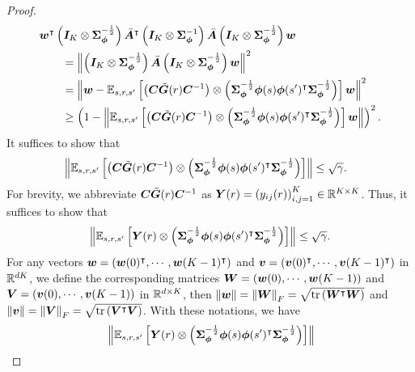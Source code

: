 \begin{proof}
\begin{equation*}
\begin{aligned}
        &{\bm{w}}^{\intercal} \left({{\bm{I}}_K\otimes{\bm{\Sigma}}_{{\bm{\phi}}}^{-\frac{1}{2}}}\right)\bar{{\bm{A}}}^{\intercal}\left({{\bm{I}}_K\otimes{\bm{\Sigma}}_{{\bm{\phi}}}^{-1}}\right)\bar{{\bm{A}}}\left({{\bm{I}}_K\otimes{\bm{\Sigma}}_{{\bm{\phi}}}^{-\frac{1}{2}}}\right){\bm{w}}\\
        &\qquad=\left\|{\left({{\bm{I}}_K\otimes{\bm{\Sigma}}_{{\bm{\phi}}}^{-\frac{1}{2}}}\right)\bar{{\bm{A}}}\left({{\bm{I}}_K\otimes{\bm{\Sigma}}_{{\bm{\phi}}}^{-\frac{1}{2}}}\right){\bm{w}}}\right\|^2\\
        &\qquad=\left\|{{\bm{w}}- {\mathbb E}_{s, r, s^\prime}\left[{\left({{\bm{C}}\tilde{{\bm{G}}}(r){\bm{C}}^{-1}}\right)\otimes\left({{\bm{\Sigma}}_{{\bm{\phi}}}^{-\frac{1}{2}}{\bm{\phi}}(s){\bm{\phi}}(s^\prime)^{\intercal}{\bm{\Sigma}}_{{\bm{\phi}}}^{-\frac{1}{2}}}\right)}\right]{\bm{w}} }\right\|^2\\
        &\qquad\geq\left({1-\left\|{ {\mathbb E}_{s, r, s^\prime}\left[{\left({{\bm{C}}\tilde{{\bm{G}}}(r){\bm{C}}^{-1}}\right)\otimes\left({{\bm{\Sigma}}_{{\bm{\phi}}}^{-\frac{1}{2}}{\bm{\phi}}(s){\bm{\phi}}(s^\prime)^{\intercal}{\bm{\Sigma}}_{{\bm{\phi}}}^{-\frac{1}{2}}}\right)}\right]{\bm{w}}  }\right\| }\right)^2.
\end{aligned}
\end{equation*}
It suffices to show that
    \begin{equation}\label{eq:biscuit_matrix_bound}
\begin{aligned}
        &\left\|{ {\mathbb E}_{s, r, s^\prime}\left[{\left({{\bm{C}}\tilde{{\bm{G}}}(r){\bm{C}}^{-1}}\right)\otimes\left({{\bm{\Sigma}}_{{\bm{\phi}}}^{-\frac{1}{2}}{\bm{\phi}}(s){\bm{\phi}}(s^\prime)^{\intercal}{\bm{\Sigma}}_{{\bm{\phi}}}^{-\frac{1}{2}}}\right)}\right]}\right\| \leq \sqrt\gamma.
\end{aligned}
\end{equation}
For brevity, we abbreviate ${\bm{C}}\tilde{{\bm{G}}}(r){\bm{C}}^{-1}$ as ${\bm{Y}}(r)=\left({y_{ij}(r)}\right)_{i,j=1}^K\in{\mathbb R}^{K\times K}$.
Thus, it suffices to show that
\begin{equation*}
    \left\|{{\mathbb E}_{s, r, s^\prime}\left[{{\bm{Y}}(r)\otimes\left({{\bm{\Sigma}}_{{\bm{\phi}}}^{-\frac{1}{2}}{\bm{\phi}}(s){\bm{\phi}}(s^\prime)^{\intercal}{\bm{\Sigma}}_{{\bm{\phi}}}^{-\frac{1}{2}}}\right)}\right]}\right\|\leq\sqrt\gamma.
\end{equation*}
For any vectors ${\bm{w}}=\left({{\bm{w}}(0)^{\intercal}, \cdots, {\bm{w}}(K-1)^{\intercal}}\right)$ and ${\bm{v}}=\left({{\bm{v}}(0)^{\intercal}, \cdots, {\bm{v}}(K-1)^{\intercal}}\right)$ in ${\mathbb R}^{dK}$, we define the corresponding matrices ${\bm{W}}=\left({{\bm{w}}(0), \cdots, {\bm{w}}(K-1)}\right)$ and ${\bm{V}}=\left({{\bm{v}}(0), \cdots, {\bm{v}}(K-1)}\right)$ in ${\mathbb R}^{d\times K}$, then $\left\|{{\bm{w}}}\right\|=\left\|{{\bm{W}}}\right\|_{F}=\sqrt{\operatorname{tr}\left({{\bm{W}}^\intercal {\bm{W}}}\right)}$ and $\left\|{{\bm{v}}}\right\|=\left\|{{\bm{V}}}\right\|_{F}=\sqrt{\operatorname{tr}\left({{\bm{V}}^\intercal {\bm{V}}}\right)}$.
With these notations, we have
    \begin{equation*}
\begin{aligned}
        &\norm{\EB_{s, r, s^\prime}\brk{\bY(r)\otimes\prn{\bSigma_{\bphi}^{-\frac{1}{2}}\bphi(s)\bphi(s^\prime)^{\intercal}\bSigma_{\bphi}^{-\frac{1}{2}}}}}\\

\end{aligned}
\end{equation*}
\end{proof}
